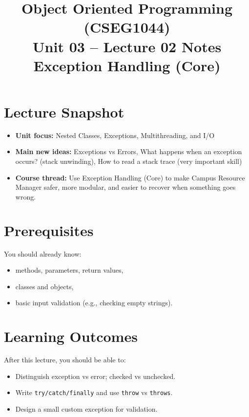 \documentclass[11pt]{article}
\title{Object Oriented Programming (CSEG1044)\\Unit 03 -- Lecture 02 Notes\\Exception Handling (Core)}
\begin{document}
\maketitle
\tableofcontents

\section{Lecture Snapshot}
\begin{itemize}
  \item \textbf{Unit focus:} Nested Classes, Exceptions, Multithreading, and I/O
  \item \textbf{Main new ideas:} Exceptions vs Errors, What happens when an exception occurs? (stack unwinding), How to read a stack trace (very important skill)
  \item \textbf{Course thread:} Use Exception Handling (Core) to make Campus Resource Manager safer, more modular, and easier to recover when something goes wrong.
\end{itemize}
\notesources{\OOPSUnitIIISources}

\section{Prerequisites}
You should already know:
\begin{itemize}
  \item methods, parameters, return values,
  \item classes and objects,
  \item basic input validation (e.g., checking empty strings).
\end{itemize}

\section{Learning Outcomes}
After this lecture, you should be able to:
\begin{itemize}
  \item Distinguish exception vs error; checked vs unchecked.
  \item Write \texttt{try/catch/finally} and use \texttt{throw} vs \texttt{throws}.
  \item Design a small custom exception for validation.
\end{itemize}
\end{document}
